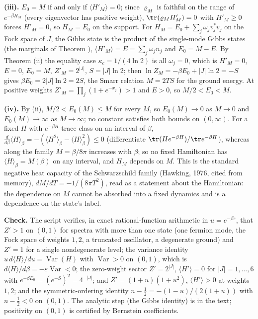 \textbf{(iii).} $E_0 = M$ if and only if $\langle H'_M\rangle = 0$; since $\varrho_M$ is faithful on the range of $e^{-\beta H_M}$ (every eigenvector has positive weight), $\tr(\varrho_M H'_M) = 0$ with $H'_M \geq 0$ forces $H'_M = 0$, so $H_M = E_0$ on the support. For $H_M = E_0 + \sum_j\omega_jv_j^{*}v_j$ on the Fock space of $J$, the Gibbs state is the product of the single-mode Gibbs states (the marginals of Theorem ), $\langle H'_M\rangle = E = \sum_j\omega_jn_j$ and $E_0 = M - E$. By Theorem (ii) the equality case $\kappa_c = 1/(4\ln 2)$ is all $\omega_j = 0$, which is $H'_M = 0$, $E = 0$, $E_0 = M$, $Z'_M = 2^{|J|}$, $S = |J|\ln 2$; then $\ln Z_M = -\beta E_0 + |J|\ln 2 = -S$ gives $\beta E_0 = 2|J|\ln 2 = 2S$, the Smarr relation $M = 2TS$ for the ground energy. At positive weights $Z'_M = \prod_j(1 + e^{-x_j}) > 1$ and $E > 0$, so $M/2 < E_0 < M$.

\textbf{(iv).} By (ii), $M/2 < E_0(M) \leq M$ for every $M$, so $E_0(M) \to 0$ as $M \to 0$ and $E_0(M) \to \infty$ as $M \to \infty$; no constant satisfies both bounds on $(0, \infty)$. For a fixed $H$ with $e^{-\beta H}$ trace class on an interval of $\beta$, $\frac{d}{d\beta}\langle H\rangle_\beta = -(\langle H^{2}\rangle_\beta - \langle H\rangle_\beta^{2}) \leq 0$ (differentiate $\tr(He^{-\beta H})/\tr e^{-\beta H}$), whereas along the family $M = \beta/8\pi$ increases with $\beta$; so no fixed Hamiltonian has $\langle H\rangle_\beta = M(\beta)$ on any interval, and $H_M$ depends on $M$. This is the standard negative heat capacity of the Schwarzschild family (Hawking, 1976, cited from memory), $dM/dT = -1/(8\pi T^{2})$, read as a statement about the Hamiltonian: the dependence on $M$ cannot be absorbed into a fixed dynamics and is a dependence on the state's label.

\textbf{Check.} The script verifies, in exact rational-function arithmetic in $u = e^{-\beta\varepsilon}$, that $Z' > 1$ on $(0, 1)$ for spectra with more than one state (one fermion mode, the Fock space of weights $1, 2$, a truncated oscillator, a degenerate ground) and $Z' = 1$ for a single nondegenerate level; the variance identity $u\,d\langle H\rangle/du = \operatorname{Var}(H)$ with $\operatorname{Var} > 0$ on $(0, 1)$, which is $d\langle H\rangle/d\beta = -\varepsilon\operatorname{Var} < 0$; the zero-weight sector $Z' = 2^{|J|}$, $\langle H'\rangle = 0$ for $|J| = 1, \ldots, 6$ with $e^{-\beta E_0} = (e^{-S})^{2} = 4^{-|J|}$; and $Z' = (1 + u)(1 + u^{2})$, $\langle H'\rangle > 0$ at weights $1, 2$; and the symmetric-ordering identity $n - \tfrac12 = -(1 - u)/(2(1 + u))$ with $n - \tfrac12 < 0$ on $(0, 1)$. The analytic step (the Gibbs identity) is in the text; positivity on $(0, 1)$ is certified by Bernstein coefficients.

